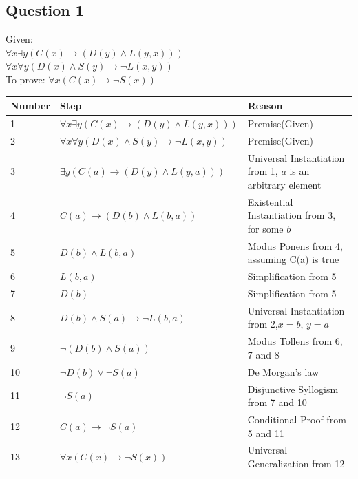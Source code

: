 \documentclass[12pt,a4paper]{article}
\begin{document}
\subsection*{Question 1}
Given:\\
$\forall x \exists y(C(x) \to (D(y) \land L(y,x)))$\\
$\forall x \forall y(D(x) \land S(y) \to \neg L(x,y))$\\
To prove: $\forall x(C(x) \to \neg S(x))$
\begin{table}[h!]
\centering
\renewcommand{\arraystretch}{1.2} 
\begin{tabular}{|l | p{6cm} | p{4.5cm} |}
\hline
\textbf{Number} & \textbf{Step} & \textbf{Reason} \\
\hline
1 & $\forall x \exists y(C(x) \to (D(y) \land L(y,x)))$& Premise(Given) \\
\hline
2 & $\forall x \forall y(D(x) \land S(y) \to \neg L(x,y))$ & Premise(Given) \\
\hline
3 & $ \exists y(C(a) \to (D(y) \land L(y,a)))$&Universal Instantiation from 1, $a$ is an arbitrary element\\
\hline
4&$C(a) \to (D(b) \land L(b,a))$&Existential Instantiation from 3, for some $b$\\
\hline
5&$D(b) \land L(b,a)$&Modus Ponens from 4, assuming C(a) is true \\
\hline
6&$L(b,a)$&Simplification from 5\\
\hline
7&$D(b)$ &Simplification from 5 \\
\hline
8& $D(b) \land S(a) \to \neg L(b,a)$ &Universal Instantiation from 2,$x=b$,  $y=a$\\
\hline
9&$\neg (D(b) \land S(a))$ &Modus Tollens from 6, 7 and 8 \\
\hline
10&$\neg D(b) \lor \neg S(a)$ &De Morgan's law \\
\hline
11&$\neg S(a)$&Disjunctive Syllogism from 7 and 10\\
\hline
12& $C(a) \to \neg S(a)$ & Conditional Proof from 5 and 11\\
\hline
13&$\forall x(C(x) \to \neg S(x))$& Universal Generalization from 12 \\
\hline
\end{tabular}
\end{table}
\newpage
\end{document}
